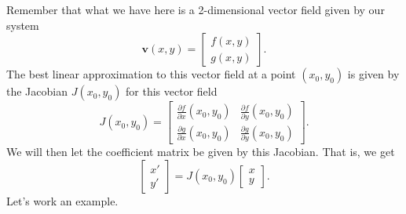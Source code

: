         Remember that what we have here is a 2-dimensional vector field given by our system
        \[
        \mathbf{v}(x,y) = \begin{bmatrix} f(x,y) \\ g(x,y) \end{bmatrix}.
        \]
        The best linear approximation to this vector field at a point $(x_0,y_0)$ is given by the Jacobian $J(x_0,y_0)$ for this vector field
        \[
        J(x_0,y_0) = \begin{bmatrix} \frac{\partial f}{\partial x}(x_0,y_0) & \frac{\partial f}{\partial y}(x_0,y_0) \\
        \frac{\partial g}{\partial x}(x_0,y_0) & \frac{\partial g}{\partial y}(x_0,y_0) \end{bmatrix}.
        \]
        We will then let the coefficient matrix be given by this Jacobian.  That is, we get
        \[
        \begin{bmatrix} x' \\ y' \end{bmatrix} = J(x_0,y_0)\begin{bmatrix} x \\ y \end{bmatrix}.
        \]
        Let's work an example.
        
